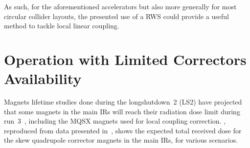 As such, for the aforementioned accelerators but also more generally for most circular collider layouts, the presented use of a \acrlong{RWS} could provide a useful method to tackle local linear coupling.

\section{Operation with Limited Correctors Availability}
\label{section:limited_correctors_availability}

Magnets lifetime studies done during the \gls{longshutdown}~\num{2} (LS\num{2}) have projected that some magnets in the main \glspl{IR} will reach their radiation dose limit during \Gls{run}~\num{3}~\cite{PRES:Cerutti:TripletLifetime_Evian}, including the MQSX magnets used for local coupling correction.
, reproduced from data presented in~\cite{PRES:Cerutti:TripletLifetime_Evian}, shows the expected total received dose for the skew quadrupole corrector magnets in the main IRs, for various scenarios.

